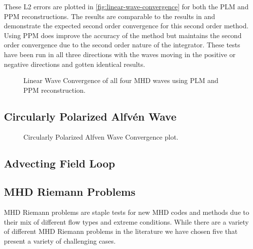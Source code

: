 These L2 errors are plotted in \autoref{fig:linear-wave-convergence} for both the PLM and PPM reconstructions. The results are comparable to the results in \cite{stone_2009} and demonstrate the expected second order convergence for this second order method. Using PPM does improve the accuracy of the method but maintains the second order convergence due to the second order nature of the integrator. These tests have been run in all three directions with the waves moving in the positive or negative directions and gotten identical results.

\begin{figure}[ht!]
    \caption{Linear Wave Convergence of all four MHD waves using PLM and PPM reconstruction. 
    \href{https://github.com/bcaddy/caddy-et-al-2023/blob/5fcdc30d0fdd93bd7cbf716c7fbc7142daedec20/python/linear-wave-convergence.py}{}
    }
    \label{fig:linear-wave-convergence}
\end{figure}

\subsection{Circularly Polarized Alfv\'en Wave}
\label{sec:cpaw}

\begin{figure}[ht!]
    \caption{Circularly Polarized Alfven Wave Convergence plot. }
    \label{fig:cpaw}
\end{figure}

\subsection{Advecting Field Loop}
\label{sec:afl}

\subsection{MHD Riemann Problems}
\label{sec:riemann}

MHD Riemann problems are staple tests for new MHD codes and methods due to their mix of different flow types and extreme conditions. While there are a variety of different MHD Riemann problems in the literature \citep{brio_wu_1988, einfeldt_1991, ryu_jones_1995, dai_woodward_1998} we have chosen five that present a variety of challenging cases. 

